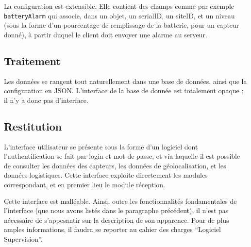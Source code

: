 La configuration est extensible. Elle contient des champs comme par exemple \texttt{batteryAlarm} qui associe, dans un objet, un serialID, un siteID, et un niveau (sous la forme d'un pourcentage de remplissage de la batterie, pour un capteur donné), à partir duquel le client doit envoyer une alarme au serveur.

\subsection{Traitement}

Les données se rangent tout naturellement dans une base de données, ainsi que la configuration en JSON. L'interface de la base de donnée est totalement opaque ; il n'y a donc pas d'interface.

\subsection{Restitution}

L'interface utilisateur se présente sous la forme d'un logiciel dont l'authentification se fait par login et mot de passe, et via laquelle il est possible de consulter les données des capteurs, les données de géolocalisation, et les données logistiques. Cette interface exploite directement les modules correspondant, et en premier lieu le module réception.

Cette interface est malléable. Ainsi, outre les fonctionnalités fondamentales de l'interface (que nous avons listés dans le paragraphe précédent), il n'est pas nécessaire de s'appesantir sur la description de son apparence. Pour de plus amples informations, il faudra se reporter au cahier des charges ``Logiciel Supervision''.

